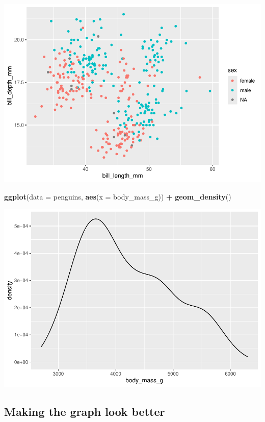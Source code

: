\documentclass[
]{book}
\newenvironment{Shaded}{\begin{snugshade}}{\end{snugshade}}
\newcommand{\AttributeTok}[1]{\textcolor[rgb]{0.13,0.29,0.53}{#1}}
\newcommand{\FunctionTok}[1]{\textcolor[rgb]{0.13,0.29,0.53}{\textbf{#1}}}
\newcommand{\NormalTok}[1]{#1}
\newcommand{\SpecialCharTok}[1]{\textcolor[rgb]{0.81,0.36,0.00}{\textbf{#1}}}
\begin{document}
\includegraphics{_main_files/figure-latex/unnamed-chunk-58-1.pdf}

\begin{Shaded}
\begin{Highlighting}[]
\FunctionTok{ggplot}\NormalTok{(}\AttributeTok{data =}\NormalTok{ penguins, }\FunctionTok{aes}\NormalTok{(}\AttributeTok{x =}\NormalTok{ body\_mass\_g)) }\SpecialCharTok{+} 
  \FunctionTok{geom\_density}\NormalTok{()}
\end{Highlighting}
\end{Shaded}

\includegraphics{_main_files/figure-latex/unnamed-chunk-58-2.pdf}

\subsection{Making the graph look better}\label{making-the-graph-look-better}
\end{document}
